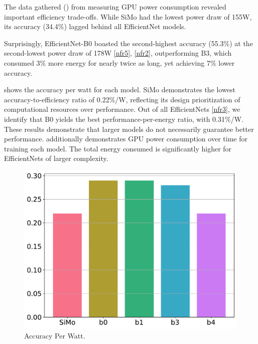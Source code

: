 The data gathered () from measuring GPU power consumption revealed important efficiency trade-offs. While SiMo had the lowest power draw of 155W, its accuracy (34.4\%) lagged behind all EfficientNet models.

Surprisingly, EfficientNet-B0 boasted the second-highest accuracy (55.3\%) at the second-lowest power draw of 178W \ref{nfr5}, \ref{nfr2}, outperforming B3, which consumed 3\% more energy for nearly twice as long, yet achieving 7\% lower accuracy.

 shows the accuracy per watt for each model. SiMo demonstrates the lowest accuracy-to-efficiency ratio of 0.22\%/W, reflecting its design prioritization of computational resources over performance. Out of all EfficientNets \ref{nfr3}, we identify that B0 yields the best performance-per-energy ratio, with 0.31\%/W. These results demonstrate that larger models do not necessarily guarantee better performance.  additionally demonstrates GPU power consumption over time for training each model. The total energy consumed is significantly higher for EfficientNets of larger complexity.

\begin{figure}
    \centering
    \includegraphics[width=1\linewidth]{figures/accuracy_per_watt.pdf}
    \caption{Accuracy Per Watt.}
    \label{fig:exp1:fig6}
\end{figure}

